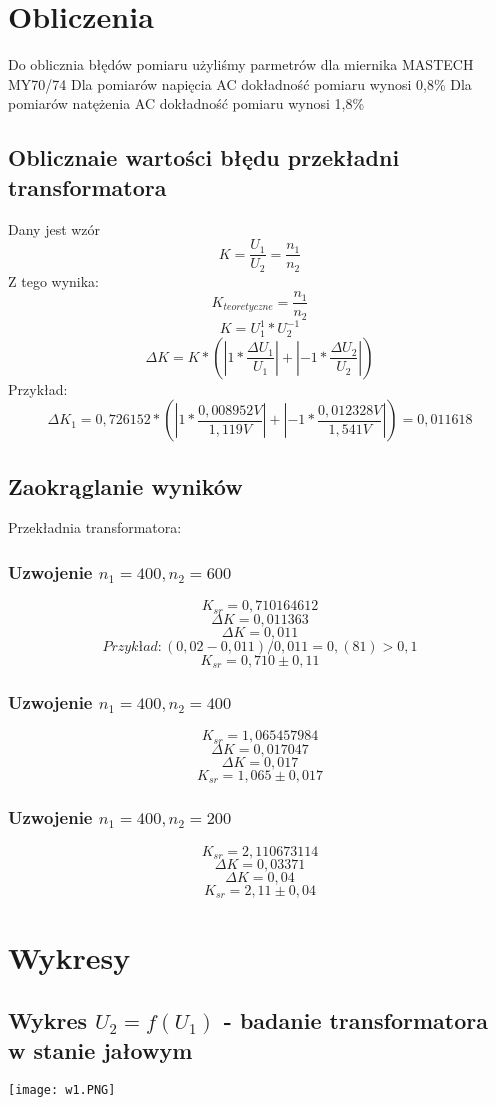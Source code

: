\documentclass[polish,a4paper]{article}
\begin{document}
\section{Obliczenia}
Do oblicznia błędów pomiaru użyliśmy parmetrów dla miernika MASTECH MY70/74
\newline
Dla pomiarów napięcia AC dokładność pomiaru wynosi 0,8\%
\newline
Dla pomiarów natężenia AC dokładność pomiaru wynosi 1,8\%
\subsection{Oblicznaie wartości błędu przekładni transformatora}
Dany jest wzór
$$K = \frac{U_1}{U_2} = \frac{n_1}{n_2}$$
Z tego wynika:
$$K_{teoretyczne} = \frac{n_1}{n_2}$$
$$K = U_{1}^{1}*U_{2}^{-1}$$
$$\Delta K = K*(|1*\frac{\Delta U_1}{U_1}|+|-1*\frac{\Delta U_2}{U_2}|) $$
Przykład:
$$ \Delta K_1 = 0,726152 * (|1*\frac{0,008952 V}{1,119 V}|+|-1*\frac{0,012328 V}{1,541 V}|) = 0,011618 $$
\subsection{Zaokrąglanie wyników}
Przekładnia transformatora:
\subsubsection{Uzwojenie $n_1 = 400, n_2 = 600$}
$$K_{sr} = 0,710164612$$
$$\Delta K = 0,011363$$
$$\Delta K = 0,011$$
$$Przykład:(0,02-0,011)/0,011 = 0,(81)>0,1$$
$$K_{sr}=0,710\pm0,11$$
\subsubsection{Uzwojenie $n_1 = 400, n_2 = 400$}
$$K_{sr} = 1,065457984$$
$$\Delta K = 0,017047$$
$$\Delta K = 0,017$$
$$K_{sr} = 1,065\pm0,017$$
\subsubsection{Uzwojenie $n_1 = 400, n_2 = 200$}
$$K_{sr} = 2,110673114$$
$$\Delta K = 0,03371$$
$$\Delta K = 0,04$$
$$K_{sr} = 2,11\pm 0,04$$

\section{Wykresy}
\subsection{Wykres $U_2 = f(U_1)$ - badanie transformatora w stanie jałowym}
\texttt{[image: w1.PNG]}
\end{document}
